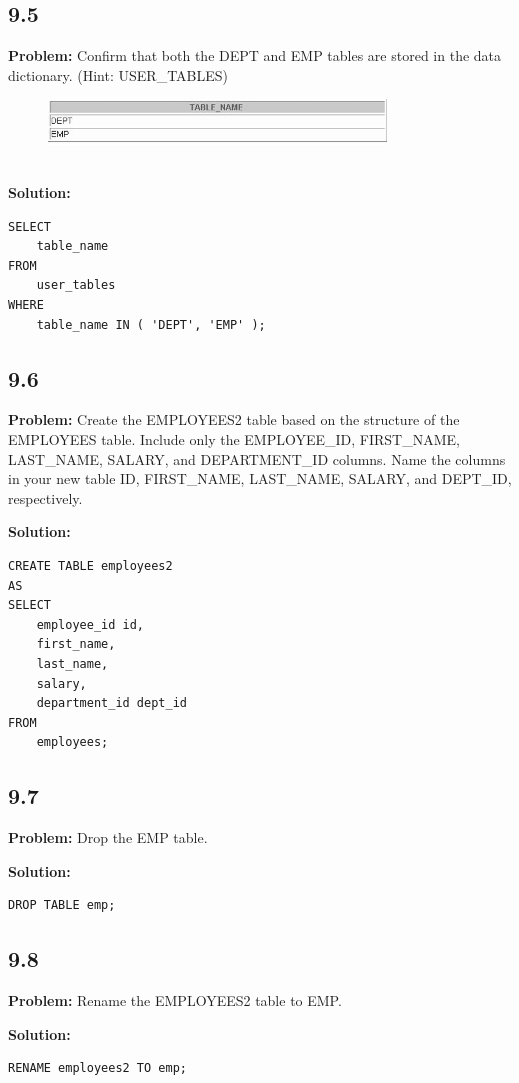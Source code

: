\documentclass[12pt,a4paper]{article}
\begin{document}
\begin{itemize}
\subsection*{9.5}
\textbf{Problem:} Confirm that both the DEPT and EMP tables are stored in the data dictionary. (Hint: USER\_TABLES)
\\
\begin{figure}[htbp]
  \centering
  \includegraphics[width=0.8\textwidth]{Screenshots/95.png}
\end{figure}\\
\textbf{Solution:}
\begin{lstlisting}
SELECT 
    table_name
FROM
    user_tables
WHERE
    table_name IN ( 'DEPT', 'EMP' );
\end{lstlisting}

\subsection*{9.6}
\textbf{Problem:} Create the EMPLOYEES2 table based on the structure of the EMPLOYEES table. Include only the EMPLOYEE\_ID, FIRST\_NAME, LAST\_NAME, SALARY, and DEPARTMENT\_ID columns. Name the columns in your new table ID, FIRST\_NAME, LAST\_NAME, SALARY, and DEPT\_ID, respectively.

\textbf{Solution:}
\begin{lstlisting}
CREATE TABLE employees2 
AS
SELECT
    employee_id id,
    first_name,
    last_name,
    salary,
    department_id dept_id
FROM
    employees;
\end{lstlisting}

\subsection*{9.7}
\textbf{Problem:} Drop the EMP table.

\textbf{Solution:}
\begin{lstlisting}
DROP TABLE emp;
\end{lstlisting}

\subsection*{9.8}
\textbf{Problem:} Rename the EMPLOYEES2 table to EMP.

\textbf{Solution:}
\begin{lstlisting}
RENAME employees2 TO emp;
\end{lstlisting}


\end{itemize}
\end{document}
